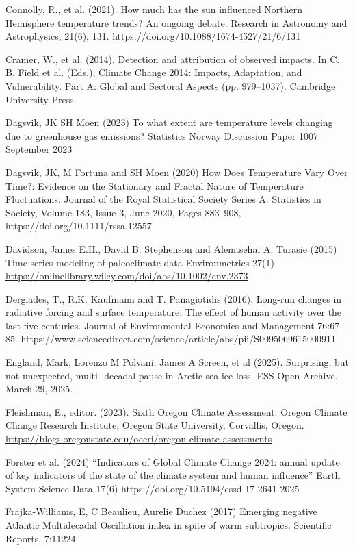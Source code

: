\documentclass[12pt,paper=a4,DIV=12,parskip=never,chapterprefix=false,headings=standardclasses]{scrreprt}
\begin{document}
Connolly, R., et al. (2021). How much has the sun influenced Northern Hemisphere temperature trends?
An ongoing debate. Research in Astronomy and Astrophysics, 21(6), 131.
https://doi.org/10.1088/1674-4527/21/6/131

Cramer, W., et al. (2014). Detection and attribution of observed impacts. In C. B. Field et al. (Eds.),
Climate Change 2014: Impacts, Adaptation, and Vulnerability. Part A: Global and Sectoral Aspects
(pp. 979–1037). Cambridge University Press.

Dagsvik, JK SH Moen (2023) To what extent are temperature levels changing due to greenhouse gas
emissions? Statistics Norway Discussion Paper 1007 September 2023

Dagsvik, JK, M Fortuna and SH Moen (2020) How Does Temperature Vary Over Time?: Evidence on the
Stationary and Fractal Nature of Temperature Fluctuations. Journal of the Royal Statistical Society
Series A: Statistics in Society, Volume 183, Issue 3, June 2020, Pages 883–908,
https://doi.org/10.1111/rssa.12557

Davidson, James E.H., David B. Stephenson and Alemtsehai A. Turasie (2015) Time series modeling of
paleoclimate data Environmetrics 27(1) \url{https://onlinelibrary.wiley.com/doi/abs/10.1002/env.2373}

Dergiades, T., R.K. Kaufmann and T. Panagiotidis (2016). Long-run changes in radiative forcing and
surface temperature: The effect of human activity over the last five centuries. Journal of Environmental
Economics and Management 76:67—85.
https://www.sciencedirect.com/science/article/abs/pii/S0095069615000911

England, Mark, Lorenzo M Polvani, James A Screen, et al (2025). Surprising, but not unexpected, multi-
decadal pause in Arctic sea ice loss. ESS Open Archive. March 29, 2025.

Fleishman, E., editor. (2023). Sixth Oregon Climate Assessment. Oregon Climate Change Research
Institute, Oregon State University, Corvallis, Oregon. \url{https://blogs.oregonstate.edu/occri/oregon-climate-assessments}

Forster et al. (2024) “Indicators of Global Climate Change 2024: annual update of key indicators of the
state of the climate system and human influence” Earth System Science Data 17(6)
https://doi.org/10.5194/essd-17-2641-2025

Frajka-Williams, E, C Beaulieu, Aurelie Duchez (2017) Emerging negative Atlantic Multidecadal
Oscillation index in spite of warm subtropics. Scientific Reports, 7:11224
\end{document}
